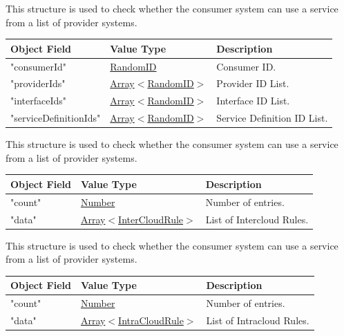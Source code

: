 \documentclass[a4paper]{arrowhead}
\newcommand{\mref}[1]{{\textcolor{ArrowheadPurple}{\hyperref[sec:model:#1]{#1}}}}
\newcommand{\pref}[1]{{\textcolor{ArrowheadGrey}{\hyperref[sec:model:primitives:#1]{#1}}}}
\begin{document}

This structure is used to check whether the consumer system can use a service from a list of provider systems.

\begin{table}[ht!]
\begin{tabularx}{\textwidth}{| p{5cm} | p{5cm} | X |} \hline
\rowcolor{gray!33} Object Field & Value Type      & Description \\ \hline
"consumerId"                & \pref{RandomID}     & Consumer ID. \\ \hline
"providerIds"            & \pref{Array}$<$\mref{RandomID}$>$     & Provider ID List. \\ \hline
"interfaceIds"           & \pref{Array}$<$\mref{RandomID}$>$     & Interface ID List. \\ \hline
"serviceDefinitionIds"   & \pref{Array}$<$\mref{RandomID}$>$     & Service Definition ID List. \\ \hline

\end{tabularx}
\end{table}



This structure is used to check whether the consumer system can use a service from a list of provider systems.

\begin{table}[ht!]
\begin{tabularx}{\textwidth}{| p{5cm} | p{5cm} | X |} \hline
\rowcolor{gray!33} Object Field & Value Type      & Description \\ \hline
"count"                   & \pref{Number}     & Number of entries. \\ \hline
"data"  & \pref{Array}$<$\mref{InterCloudRule}$>$     & List of Intercloud Rules. \\ \hline

\end{tabularx}
\end{table}


This structure is used to check whether the consumer system can use a service from a list of provider systems.

\begin{table}[ht!]
\begin{tabularx}{\textwidth}{| p{5cm} | p{5cm} | X |} \hline
\rowcolor{gray!33} Object Field & Value Type      & Description \\ \hline
"count"                   & \pref{Number}     & Number of entries. \\ \hline
"data"  & \pref{Array}$<$\mref{IntraCloudRule}$>$     & List of Intracloud Rules. \\ \hline

\end{tabularx}
\end{table}
\end{document}

